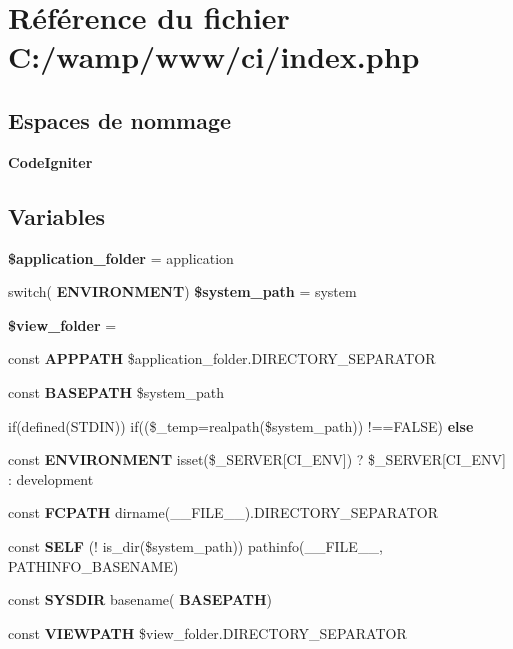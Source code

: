\section{Référence du fichier C\+:/wamp/www/ci/index.php}
\label{index_8php}
\subsection*{Espaces de nommage}
\begin{DoxyCompactItemize}
\item 
 \textbf{ Code\+Igniter}
\end{DoxyCompactItemize}
\subsection*{Variables}
\begin{DoxyCompactItemize}
\item 
\textbf{ \$application\+\_\+folder} = \textquotesingle{}application\textquotesingle{}
\item 
switch(\textbf{ E\+N\+V\+I\+R\+O\+N\+M\+E\+NT}) \textbf{ \$system\+\_\+path} = \textquotesingle{}system\textquotesingle{}
\item 
\textbf{ \$view\+\_\+folder} = \textquotesingle{}\textquotesingle{}
\item 
const \textbf{ A\+P\+P\+P\+A\+TH} \$application\+\_\+folder.\+D\+I\+R\+E\+C\+T\+O\+R\+Y\+\_\+\+S\+E\+P\+A\+R\+A\+T\+OR
\item 
const \textbf{ B\+A\+S\+E\+P\+A\+TH} \$system\+\_\+path
\item 
if(defined(\textquotesingle{}S\+T\+D\+IN\textquotesingle{})) if((\$\+\_\+temp=realpath(\$system\+\_\+path)) !==F\+A\+L\+SE) \textbf{ else}
\item 
const \textbf{ E\+N\+V\+I\+R\+O\+N\+M\+E\+NT} isset(\$\+\_\+\+S\+E\+R\+V\+ER[\textquotesingle{}C\+I\+\_\+\+E\+NV\textquotesingle{}]) ? \$\+\_\+\+S\+E\+R\+V\+ER[\textquotesingle{}C\+I\+\_\+\+E\+NV\textquotesingle{}] \+: \textquotesingle{}development\textquotesingle{}
\item 
const \textbf{ F\+C\+P\+A\+TH} dirname(\+\_\+\+\_\+\+F\+I\+L\+E\+\_\+\+\_\+).D\+I\+R\+E\+C\+T\+O\+R\+Y\+\_\+\+S\+E\+P\+A\+R\+A\+T\+OR
\item 
const \textbf{ S\+E\+LF} (! is\+\_\+dir(\$system\+\_\+path)) pathinfo(\+\_\+\+\_\+\+F\+I\+L\+E\+\_\+\+\_\+, P\+A\+T\+H\+I\+N\+F\+O\+\_\+\+B\+A\+S\+E\+N\+A\+ME)
\item 
const \textbf{ S\+Y\+S\+D\+IR} basename(\textbf{ B\+A\+S\+E\+P\+A\+TH})
\item 
const \textbf{ V\+I\+E\+W\+P\+A\+TH} \$view\+\_\+folder.\+D\+I\+R\+E\+C\+T\+O\+R\+Y\+\_\+\+S\+E\+P\+A\+R\+A\+T\+OR
\end{DoxyCompactItemize}


